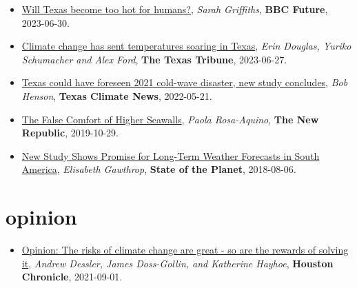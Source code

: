 \documentclass[10pt,oneside]{article}
\begin{document}
\begin{itemize}[label={}]

  \item \href{https://www.bbc.com/future/article/20230630-will-texas-become-too-hot-for-humans}{Will Texas become too hot for humans?}, \textit{Sarah Griffiths}, \textbf{BBC Future}, 2023-06-30.

  \item \href{https://www.texastribune.org/2023/06/27/texas-climate-change-heat/}{Climate change has sent temperatures soaring in Texas}, \textit{Erin Douglas, Yuriko Schumacher and Alex Ford}, \textbf{The Texas Tribune}, 2023-06-27.

  \item \href{https://texasclimatenews.org/2022/05/21/texas-could-have-foreseen-2021-cold-wave-disaster-new-study-concludes/}{Texas could have foreseen 2021 cold-wave disaster, new study concludes}, \textit{Bob Henson}, \textbf{Texas Climate News}, 2022-05-21.

  \item \href{https://newrepublic.com/article/155519/false-comfort-higher-seawalls}{The False Comfort of Higher Seawalls}, \textit{Paola Rosa-Aquino}, \textbf{The New Republic}, 2019-10-29.

  \item \href{https://blogs.ei.columbia.edu/2018/08/06/subseasonal-weather-forecasts-paraguay/}{New Study Shows Promise for Long-Term Weather Forecasts in South America}, \textit{Elisabeth Gawthrop}, \textbf{State of the Planet}, 2018-08-06.

\end{itemize}

\section{opinion}

\mbox{}\vspace{-\dimexpr\baselineskip\relax}

\begin{itemize}[label={}]

  \item \href{https://www.houstonchronicle.com/opinion/outlook/article/Opinion-The-risks-of-climate-change-are-great-16426616.php}{Opinion: The risks of climate change are great - so are the rewards of solving it}, \textit{Andrew Dessler, James Doss-Gollin, and Katherine Hayhoe}, \textbf{Houston Chronicle}, 2021-09-01.

\end{itemize}
\end{document}
